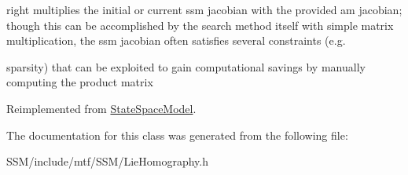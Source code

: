 right multiplies the initial or current ssm jacobian with the provided am jacobian; though this can be accomplished by the search method itself with simple matrix multiplication, the ssm jacobian often satisfies several constraints (e.\-g. 

sparsity) that can be exploited to gain computational savings by manually computing the product matrix 

Reimplemented from \hyperlink{classStateSpaceModel_ac956c679581e746891c62755fe715b3b}{State\-Space\-Model}.



The documentation for this class was generated from the following file\-:\begin{DoxyCompactItemize}
\item 
S\-S\-M/include/mtf/\-S\-S\-M/Lie\-Homography.\-h\end{DoxyCompactItemize}
